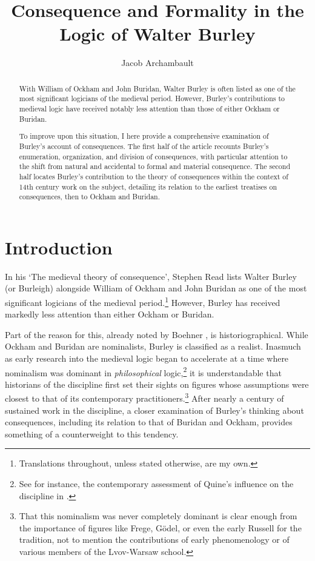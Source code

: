 \documentclass[]{birkjour}
\title{Consequence and Formality in the Logic of Walter Burley}
\author{Jacob Archambault}
\begin{document}
	
	\begin{abstract}
		With William of Ockham and John Buridan, Walter Burley is often listed as one of the most significant logicians of the medieval period. However, Burley's contributions to medieval logic have received notably less attention than those of either Ockham or Buridan. 
		
		To improve upon this situation, I here provide a comprehensive examination of Burley's account of consequences. The first half of the article recounts Burley's enumeration, organization, and division of consequences, with particular attention to the shift from natural and accidental to formal and material consequence. The second half locates Burley's contribution to the theory of consequences within the context of 14th century work on the subject, detailing its relation to the earliest treatises on consequences, then to Ockham and Buridan. 
	\end{abstract}
	\maketitle
	\section{Introduction}
In his `The medieval theory of consequence', Stephen Read lists Walter Burley (or Burleigh) alongside William of Ockham and John Buridan as one of the most significant logicians of the medieval period.\footnote{\autocite[p. 900]{Read2012} Translations throughout, unless stated otherwise, are my own.} However, Burley has received markedly less attention than either Ockham or Buridan. 
	
Part of the reason for this, already noted by Boehner \autocite[p. VI]{Boehner1955}, is historiographical. While Ockham and Buridan are nominalists, Burley is classified as a realist. Inasmuch as early research into the medieval logic began to accelerate at a time where nominalism was dominant in \textit{philosophical} logic,\footnote{See for instance, the contemporary assessment of Quine's influence on the discipline in \autocite{Lejewski1954}.} it is understandable that historians of the discipline first set their sights on figures whose assumptions were closest to that of its contemporary practitioners.\footnote{That this nominalism was never completely dominant is clear enough from the importance of figures like Frege, G\"{o}del, or even the early Russell for the tradition, not to mention the contributions of early phenomenology or of various members of the Lvov-Warsaw school.} After nearly a century of sustained work in the discipline, a closer examination of Burley's thinking about consequences, including its relation to that of Buridan and Ockham, provides something of a counterweight to this tendency. 
\end{document}
